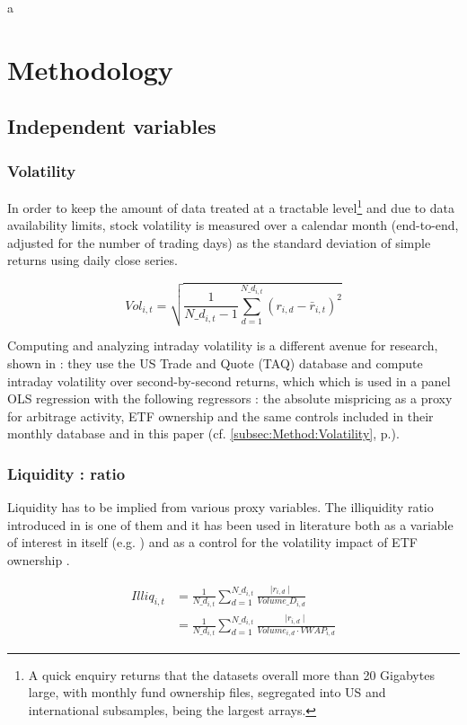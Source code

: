 a\section{Methodology}
\subsection{Independent variables}
\subsubsection{Volatility}
In order to keep the amount of data treated at a tractable level\footnote{A quick enquiry returns that the datasets overall more than 20 Gigabytes large, with monthly fund ownership files, segregated into US and international subsamples, being the largest arrays.} and due to data availability limits, stock volatility is measured over a calendar month (end-to-end, adjusted for the number of trading days) as the standard deviation of simple returns using daily close series.

\begin{equation}
  Vol_{i, t} = \sqrt{\frac{1}{N\_d_{i, t} - 1} \sum_{d = 1}^{N\_d_{i, t}} (r_{i, d} - \bar{r}_{i, t})^2}
  \end{equation}

Computing and analyzing intraday volatility is a different avenue for research, shown in \cite{Ben-David2018} : they use the US Trade and Quote (TAQ) database and compute intraday volatility over second-by-second returns, which which is used in a panel OLS regression with the following regressors : the absolute mispricing as a proxy for arbitrage activity, ETF ownership and the same controls included in their monthly database and in this paper (cf. \autoref{subsec:Method:Volatility}, p.\pageref{subsec:Method:Volatility}).
\subsubsection{Liquidity : \cite{Amihud2002} ratio}
Liquidity has to be implied from various proxy variables. The illiquidity ratio introduced in \cite{Amihud2002} is one of them and it has been used in literature both as a variable of interest in itself (e.g. \cite{Israeli2017}) and as a control for the volatility impact of ETF ownership \parencite{Ben-David2018}.

\begin{equation}
  \begin{split}
    Illiq_{i, t} & = \frac{1}{N\_d_{i, t}} \sum_{d = 1}^{N\_d_{i, t}} \frac{\mid r_{i, d} \mid}{Volume\_D_{i, d}}\\
    &  = \frac{1}{N\_d_{i, t}} \sum_{d = 1}^{N\_d_{i, t}} \frac{\mid r_{i, d} \mid}{Volume_{i, d} \cdot VWAP_{i, d}}
    \end{split}
\end{equation}

